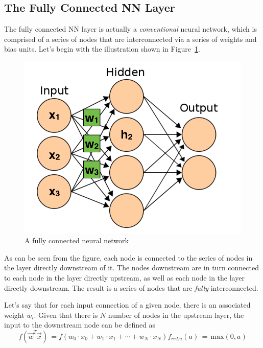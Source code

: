 \documentclass[letterpaper,12pt]{article}
\newcommand{\figref}[1]{Figure~\ref{#1}}
\begin{document}
\subsection{The Fully Connected NN Layer}

The fully connected NN layer is actually a \textit{conventional} neural network, which is comprised of a series of nodes that are interconnected via a series of weights and bias units. Let's begin with the illustration shown in \figref{ann}.

\begin{figure}[htbp]
\begin{center}
\includegraphics[scale=0.5]{images/nn_edit.png}
\caption{A fully connected neural network \cite{ann}}
\label{ann}
\end{center}
\end{figure}

As can be seen from the figure, each node is connected to the series of nodes in the layer directly downstream of it. The nodes downstream are in turn connected to each node in the layer directly upstream, as well as each node in the layer directly downstream. The result is a series of nodes that are \textit{fully} interconnected.

Let's say that for each input connection of a given node, there is an associated weight $w_i$. Given that there is $N$ number of nodes in the upstream layer, the input to the downstream node can be defined as 
\begin{equation}
f(\vec{w}^T\vec{x}) \, = f(w_0 \cdot x_0 + w_1 \cdot x_1 + \cdots + w_N \cdot x_N)
f_{reLu}(a) \, = \, \text{max}(0,a)
\end{equation}
\end{document}

